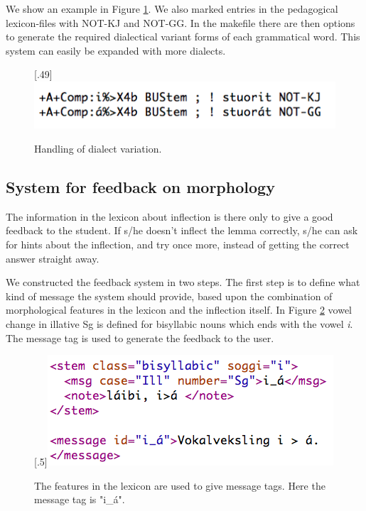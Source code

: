 \documentclass[11pt]{article}
\begin{document}
We show an example in Figure \ref{smelex}. We also marked entries in the pedagogical lexicon-files with NOT-KJ and NOT-GG. In the makefile there are then options to generate the required dialectical variant forms of each grammatical word. This system can easily be expanded with more dialects.


\begin{figure}[htbp]
\begin{center}
\scalebox{.49}[.49]{\includegraphics{presentation/img/smelex2.png}}\\
\caption{Handling of dialect variation.}
\label{smelex}
\end{center}
\end{figure}

\subsection{System for feedback on morphology}

The information in the lexicon about inflection is there only to give a good feedback to the student. If s/he doesn't inflect the lemma correctly, s/he can ask for hints about the inflection, and try once more, instead of getting the correct answer straight away. 

We constructed the feedback system in two steps. The first step is to define what kind of message the system should provide, based upon the combination of morphological features in the lexicon and the inflection itself. In Figure \ref{feedbacknouns} vowel change in illative Sg is defined for bisyllabic nouns which ends with the vowel \textit{i}. The message tag is used to generate the feedback to the user. 

\begin{figure}[htbp]
\begin{center}
\scalebox{.5}[.5]{\includegraphics{presentation/img/morphfeedback.png}}\\
\caption{The features in the lexicon are used to give message tags. Here the message tag is "i\_á".}
\label{feedbacknouns}
\end{center}
\end{figure}
\end{document}

